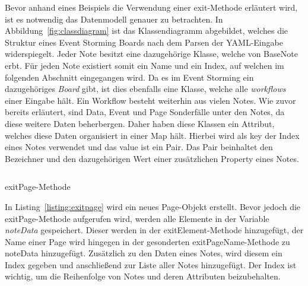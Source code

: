 Bevor anhand eines Beispiels die Verwendung einer exit-Methode erläutert wird, ist es notwendig das Datenmodell genauer zu betrachten.
In Abbildung~\ref{fig:classdiagram} ist das Klassendiagramm abgebildet, welches die Struktur eines Event Storming Boards nach dem Parsen der YAML-Eingabe widerspiegelt.
Jeder Note besitzt eine dazugehörige Klasse, welche von BaseNote erbt.
Für jeden Note existiert somit ein Name und ein Index, auf welchen im folgenden Abschnitt eingegangen wird.
Da es im Event Storming ein dazugehöriges \textit{Board} gibt, ist dies ebenfalls eine Klasse, welche alle \textit{workflows} einer Eingabe hält.
Ein Workflow besteht weiterhin aus vielen Notes.
Wie zuvor bereits erläutert, sind Data, Event und Page Sonderfälle unter den Notes, da diese weitere Daten beherbergen.
Daher haben diese Klassen ein Attribut, welches diese Daten organisiert in einer Map hält.
Hierbei wird als key der Index eines Notes verwendet und das value ist ein Pair.
Das Pair beinhaltet den Bezeichner und den dazugehörigen Wert einer zusätzlichen Property eines Notes.

\begin{listing}[!ht]
    \inputminted[firstnumber=106]{java}{listings/3.1.3/ExitPage.java}
    \caption{exitPage-Methode}
    \label{listing:exitpage}
\end{listing}

In Listing~\ref{listing:exitpage} wird ein neues Page-Objekt erstellt.
Bevor jedoch die exitPage-Methode aufgerufen wird, werden alle Elemente in der Variable \textit{noteData} gespeichert.
Dieser werden in der exitElement-Methode hinzugefügt, der Name einer Page wird hingegen in der gesonderten exitPageName-Methode zu noteData hinzugefügt.
Zusätzlich zu den Daten eines Notes, wird diesem ein Index gegeben und anschließend zur Liste aller Notes hinzugefügt.
Der Index ist wichtig, um die Reihenfolge von Notes und deren Attributen beizubehalten.
